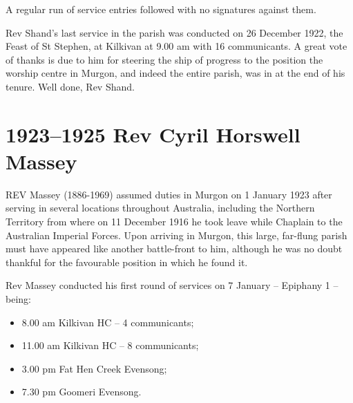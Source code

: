 A regular run of service entries followed with no signatures against them.



Rev Shand's last service in the parish was conducted on 26 December 1922, the Feast of St Stephen, at Kilkivan at 9.00 am with 16 communicants. A great vote of thanks is due to him for steering the ship of progress to the position the worship centre in Murgon, and indeed the entire parish, was in at the end of his tenure. Well done, Rev Shand.



\begin{quote}

\end{quote}



\balance


\printendnotes[custom]
\setcounter{endnote}{0}
\chapter{1923--1925 Rev Cyril Horswell Massey}
\nobalance


\lettrine[lines=3]{R}{EV}
 Massey (1886-1969) assumed duties in Murgon on 1 January 1923 after serving in several locations throughout Australia, including the Northern Territory from where on 11 December 1916 he took leave while Chaplain to the Australian Imperial Forces. Upon arriving in Murgon, this large, far-flung parish must have appeared like another battle-front to him, although he was no doubt thankful for the favourable position in which he found it.

Rev Massey conducted his first round of services on 7 January -- Epiphany 1 -- being:



\begin{itemize}

\item

  8.00 am Kilkivan HC -- 4 communicants;

\item

  11.00 am Kilkivan HC -- 8 communicants;

\item

  3.00 pm Fat Hen Creek Evensong;

\item

  7.30 pm Goomeri Evensong.

\end{itemize}



